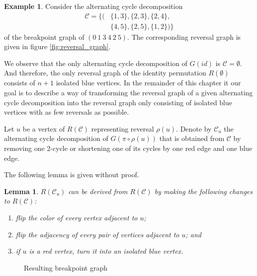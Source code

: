 \documentclass[11pt,DIV=11]{scrartcl}
\newtheorem{lemma}[theorem]{Lemma}
\theoremstyle{definition}
\newtheorem{example}{Example}[theorem]
\theoremstyle{remark}
\begin{document}
\begin{example}
Consider the alternating cycle decomposition
\begin{align*}
    \mathcal{C} = \{(&\{1,3\},\{2,3\},\{2,4\}, \\
                     &\{4,5\},\{2,5\},\{1,2\})\}
\end{align*}
of the breakpoint graph of $(0\ 1\ 3\ 4\ 2\ 5)$. The corresponding reversal graph is given in figure \ref{fig:reversal_graph}.
\end{example}

We observe that the only alternating cycle decomposition of $G(id)$ is $\mathcal{C} = \emptyset$. And therefore, the only reversal graph of the identity permutation $R(\emptyset)$ consists of $n+1$ isolated blue vertices. In the remainder of this chapter it our goal is to describe a way of transforming the reversal graph of a given alternating cycle decomposition into the reversal graph only consisting of isolated blue vertices with as few reversals as possible.

Let $u$ be a vertex of $R(\mathcal{C})$ representing reversal $\rho(u)$. Denote by $\mathcal{C}_u$ the alternating cycle decomposition of $G(\pi \circ \rho(u))$ that is obtained from $\mathcal{C}$ by removing one 2-cycle or shortening one of its cycles by one red edge and one blue edge.

The following lemma is given without proof.

\begin{lemma}
\label{lem:3}
$R(\mathcal{C}_u)$ can be derived from $R(\mathcal{C})$ by making the following changes to $R(\mathcal{C})$:
\begin{enumerate}
    \item flip the color of every vertex adjacent to $u$;
    \item flip the adjacency of every pair of vertices adjacent to $u$; and
    \item if $u$ is a red vertex, turn it into an isolated blue vertex.
\end{enumerate}
\end{lemma}

\begin{figure}
    \centering
    \caption{Resulting breakpoint graph}
    \label{fig:breakpoint_graph_change}
\end{figure}
\end{document}
